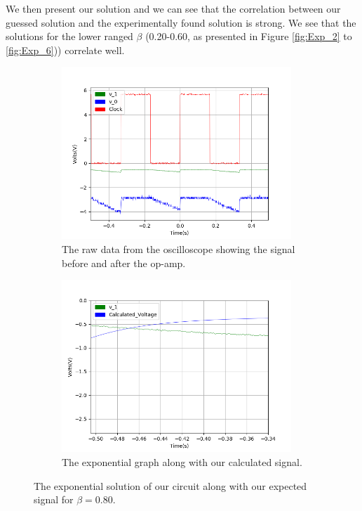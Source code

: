 We then present our solution and we can see that the correlation between our guessed solution and the experimentally found solution is strong. We see that the solutions for the lower ranged $\beta$ (0.20-0.60, as presented in Figure \ref{fig:Exp_2} to \ref{fig:Exp_6})) correlate well.

\begin{figure}[h!]
\centering
\begin{subfigure}[t]{.475\textwidth}
  \centering
  \includegraphics[width=0.95\textwidth, height=0.22\textheight]{figures/Exponential/scope_30raw.png}
  \caption{The raw data from the oscilloscope showing the signal before and after the op-amp.}
 \label{fig:Exp_8_raw}
\end{subfigure}\hfill
\begin{subfigure}[t]{.475\textwidth}
  \centering
  \includegraphics[width=0.95\textwidth, height=0.22\textheight]{figures/Exponential/scope_30_calc.png}
  \caption{The exponential graph along with our calculated signal.}
\label{fig:Exp_8_calc}
\end{subfigure}
\caption{The exponential solution of our circuit along with our expected signal for $\beta = 0.80$.}
\label{fig:Exp_8}
\end{figure}

